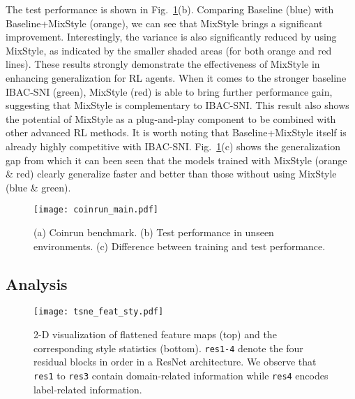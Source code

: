 \documentclass{article} \usepackage{iclr2021_conference,times}
\makeatletter
\renewcommand\paragraph{\@startsection{paragraph}{4}{\z@}{.1em \@plus1ex \@minus.2ex}{-.5em}{\normalfont\normalsize\bfseries}}
\makeatother
\begin{document}
\paragraph{Results.}
The test performance is shown in Fig.~\ref{fig:coinrun_main}(b). Comparing Baseline (blue) with Baseline+MixStyle (orange), we can see that MixStyle brings a significant improvement. Interestingly, the variance is also significantly reduced by using MixStyle, as indicated by the smaller shaded areas (for both orange and red lines). These results strongly demonstrate the effectiveness of MixStyle in enhancing generalization for RL agents. When it comes to the stronger baseline IBAC-SNI (green), MixStyle (red) is able to bring further performance gain, suggesting that MixStyle is complementary to IBAC-SNI. This result also shows the potential of MixStyle as a plug-and-play component to be combined with other advanced RL methods. It is worth noting that Baseline+MixStyle itself is already highly competitive with IBAC-SNI. Fig.~\ref{fig:coinrun_main}(c) shows the generalization gap from which it can been seen that the models trained with MixStyle (orange \& red) clearly generalize faster and better than those without using MixStyle (blue \& green).

\begin{figure}[t]
    \centering
    \texttt{[image: coinrun\_main.pdf]}
    \caption{(a) Coinrun benchmark. (b) Test performance in unseen environments. (c) Difference between training and test performance.}
    \label{fig:coinrun_main}
\end{figure}


\subsection{Analysis} \label{sec:experiments:analysis}

\begin{figure}[t]
    \centering
    \texttt{[image: tsne\_feat\_sty.pdf]}
    \caption{2-D visualization of flattened feature maps (top) and the corresponding style statistics (bottom). \texttt{res1-4} denote the four residual blocks in order in a ResNet architecture. We observe that \texttt{res1} to \texttt{res3} contain domain-related information while \texttt{res4} encodes label-related information.}
    \label{fig:tsne_feat_sty}
\end{figure}
\end{document}
